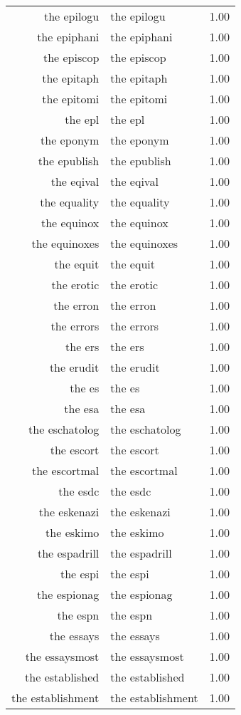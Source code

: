 \begin{table}[ht]
\begin{tabular}{rlr}
  the epilogu & the epilogu & 1.00 \\ 
  the epiphani & the epiphani & 1.00 \\ 
  the episcop & the episcop & 1.00 \\ 
  the epitaph & the epitaph & 1.00 \\ 
  the epitomi & the epitomi & 1.00 \\ 
  the epl & the epl & 1.00 \\ 
  the eponym & the eponym & 1.00 \\ 
  the epublish & the epublish & 1.00 \\ 
  the eqival & the eqival & 1.00 \\ 
  the equality & the equality & 1.00 \\ 
  the equinox & the equinox & 1.00 \\ 
  the equinoxes & the equinoxes & 1.00 \\ 
  the equit & the equit & 1.00 \\ 
  the erotic & the erotic & 1.00 \\ 
  the erron & the erron & 1.00 \\ 
  the errors & the errors & 1.00 \\ 
  the ers & the ers & 1.00 \\ 
  the erudit & the erudit & 1.00 \\ 
  the es & the es & 1.00 \\ 
  the esa & the esa & 1.00 \\ 
  the eschatolog & the eschatolog & 1.00 \\ 
  the escort & the escort & 1.00 \\ 
  the escortmal & the escortmal & 1.00 \\ 
  the esdc & the esdc & 1.00 \\ 
  the eskenazi & the eskenazi & 1.00 \\ 
  the eskimo & the eskimo & 1.00 \\ 
  the espadrill & the espadrill & 1.00 \\ 
  the espi & the espi & 1.00 \\ 
  the espionag & the espionag & 1.00 \\ 
  the espn & the espn & 1.00 \\ 
  the essays & the essays & 1.00 \\ 
  the essaysmost & the essaysmost & 1.00 \\ 
  the established & the established & 1.00 \\ 
  the establishment & the establishment & 1.00 \\ 

\end{tabular}
\end{table}
